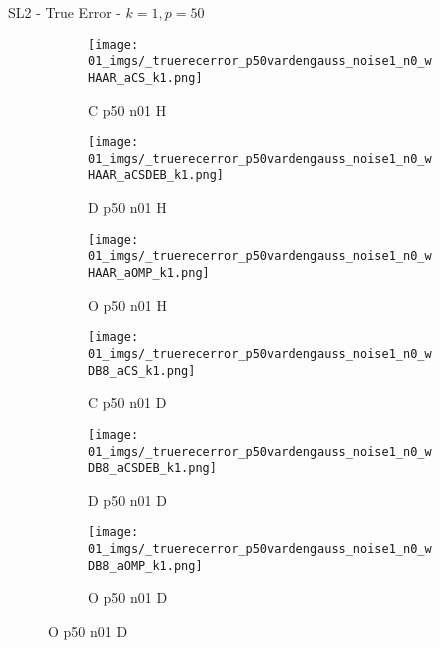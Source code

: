 \begin{frame}{SL2 - True Error - $k=1,p=50$}{}
\begin{figure}
\begin{subfigure}{0.13\textwidth}
\texttt{[image: 01\_imgs/\_truerecerror\_p50vardengauss\_noise1\_n0\_wHAAR\_aCS\_k1.png]}
\caption*{\tiny C p50 n01 H}
\end{subfigure}
\begin{subfigure}{0.13\textwidth}
\texttt{[image: 01\_imgs/\_truerecerror\_p50vardengauss\_noise1\_n0\_wHAAR\_aCSDEB\_k1.png]}
\caption*{\tiny D p50 n01 H}
\end{subfigure}
\begin{subfigure}{0.13\textwidth}
\texttt{[image: 01\_imgs/\_truerecerror\_p50vardengauss\_noise1\_n0\_wHAAR\_aOMP\_k1.png]}
\caption*{\tiny O p50 n01 H}
\end{subfigure}
\begin{subfigure}{0.13\textwidth}
\texttt{[image: 01\_imgs/\_truerecerror\_p50vardengauss\_noise1\_n0\_wDB8\_aCS\_k1.png]}
\caption*{\tiny C p50 n01 D}
\end{subfigure}
\begin{subfigure}{0.13\textwidth}
\texttt{[image: 01\_imgs/\_truerecerror\_p50vardengauss\_noise1\_n0\_wDB8\_aCSDEB\_k1.png]}
\caption*{\tiny D p50 n01 D}
\end{subfigure}
\begin{subfigure}{0.13\textwidth}
\texttt{[image: 01\_imgs/\_truerecerror\_p50vardengauss\_noise1\_n0\_wDB8\_aOMP\_k1.png]}
\caption*{\tiny O p50 n01 D}
\end{subfigure}

\vspace{5pt}


\end{figure}
\end{frame}

